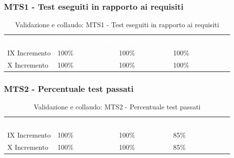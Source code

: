 \subsubsection{MTS1 - Test eseguiti in rapporto ai requisiti}
\begin{table}[H]
    \renewcommand{\arraystretch}{1.5}
    \begin{tabular}{ m{}<{\centering}  m{}<{\centering}  m{}<{\centering} m{}<{\centering} }
        \rowcolor{darkblue}
        \textcolor{white}{\textbf{Incremento}} &\textcolor{white}{\textbf{Valore calcolato}}& \textcolor{white}{\textbf{Valore ottimo}} & \textcolor{white}{\textbf{Valore tollerato}}\\ 
        
        IX Incremento & 
        100\% &
        100\% &
        100\% \\

        X Incremento & 
        100\% &
        100\% &
        100\% \\

    \end{tabular}
    \caption{Validazione e collaudo: MTS1 - Test eseguiti in rapporto ai requisiti}
\end{table}

\subsubsection{MTS2 - Percentuale test passati}
\begin{table}[H]
    \renewcommand{\arraystretch}{1.5}
    \begin{tabular}{ m{}<{\centering}  m{}<{\centering}  m{}<{\centering} m{}<{\centering} }
        \rowcolor{darkblue}
        \textcolor{white}{\textbf{Incremento}} &\textcolor{white}{\textbf{Valore calcolato}}& \textcolor{white}{\textbf{Valore ottimo}} & \textcolor{white}{\textbf{Valore tollerato}}\\ 
        
        IX Incremento & 
        100\% &
        100\% &
        85\% \\

        X Incremento & 
        100\% &
        100\% &
        85\% \\

    \end{tabular}
    \caption{Validazione e collaudo: MTS2 - Percentuale test passati}
\end{table}